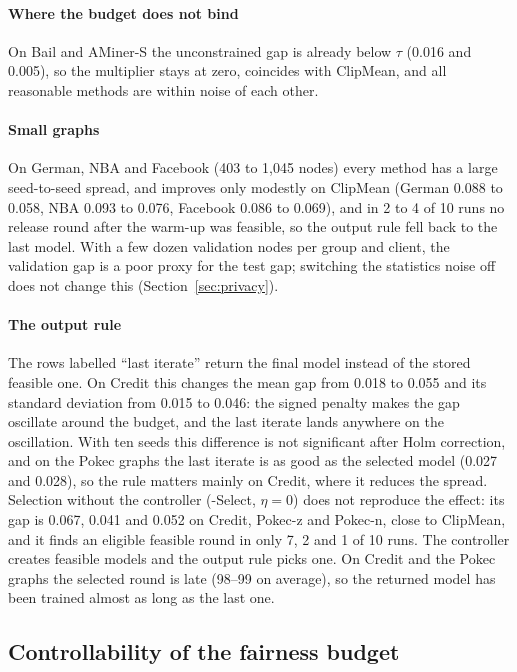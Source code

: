 \paragraph{Where the budget does not bind}
On Bail and AMiner-S the unconstrained gap is already below $\tau$ (0.016 and 0.005), so the multiplier stays at zero, \clamp{} coincides with ClipMean, and all reasonable methods are within noise of each other.

\paragraph{Small graphs}
On German, NBA and Facebook (403 to 1{,}045 nodes) every method has a large seed-to-seed spread, and \clamp{} improves only modestly on ClipMean (German 0.088 to 0.058, NBA 0.093 to 0.076, Facebook 0.086 to 0.069), and in 2 to 4 of 10 runs no release round after the warm-up was feasible, so the output rule fell back to the last model. With a few dozen validation nodes per group and client, the validation gap is a poor proxy for the test gap; switching the statistics noise off does not change this (Section~\ref{sec:privacy}).

\paragraph{The output rule}
The rows labelled ``last iterate'' return the final model instead of the stored feasible one. On Credit this changes the mean gap from 0.018 to 0.055 and its standard deviation from 0.015 to 0.046: the signed penalty makes the gap oscillate around the budget, and the last iterate lands anywhere on the oscillation. With ten seeds this difference is not significant after Holm correction, and on the Pokec graphs the last iterate is as good as the selected model (0.027 and 0.028), so the rule matters mainly on Credit, where it reduces the spread. Selection without the controller (\clamp{}-Select, $\eta=0$) does not reproduce the effect: its gap is 0.067, 0.041 and 0.052 on Credit, Pokec-z and Pokec-n, close to ClipMean, and it finds an eligible feasible round in only 7, 2 and 1 of 10 runs. The controller creates feasible models and the output rule picks one. On Credit and the Pokec graphs the selected round is late (98--99 on average), so the returned model has been trained almost as long as the last one.

\subsection{Controllability of the fairness budget}\label{sec:tau}

